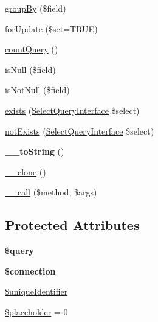 \begin{DoxyCompactItemize}
\item 
\hyperlink{classSelectQueryExtender_aa51fb0b6bc8b2484b52328f1109d1a48}{groupBy} (\$field)
\item 
\hyperlink{classSelectQueryExtender_a90e930c3ee67a055b81f7f31b18ba84e}{forUpdate} (\$set=TRUE)
\item 
\hyperlink{classSelectQueryExtender_a4c222f9407cc787f41b49be4b8ee26a5}{countQuery} ()
\item 
\hyperlink{classSelectQueryExtender_ad30e0f469cabfcc18f148468cc507cd8}{isNull} (\$field)
\item 
\hyperlink{classSelectQueryExtender_a24432e3ab40f7c1ce1404d6773e539f4}{isNotNull} (\$field)
\item 
\hyperlink{classSelectQueryExtender_aa250c6c085e53ac64607649f75b5f468}{exists} (\hyperlink{interfaceSelectQueryInterface}{SelectQueryInterface} \$select)
\item 
\hyperlink{classSelectQueryExtender_a0cd2b1d2e813fc6b8280221f6ca40777}{notExists} (\hyperlink{interfaceSelectQueryInterface}{SelectQueryInterface} \$select)
\item 
\hypertarget{classSelectQueryExtender_a0043e08d63d174a25378966bcc0d9282}{
{\bfseries \_\-\_\-toString} ()}
\label{classSelectQueryExtender_a0043e08d63d174a25378966bcc0d9282}

\item 
\hyperlink{classSelectQueryExtender_a3d9ade6266951fdc8e5757c8e61b352c}{\_\-\_\-clone} ()
\item 
\hyperlink{classSelectQueryExtender_a8cbcdc84cab9b35505c10b51d13efa89}{\_\-\_\-call} (\$method, \$args)
\end{DoxyCompactItemize}
\subsection*{Protected Attributes}
\begin{DoxyCompactItemize}
\item 
\hypertarget{classSelectQueryExtender_a1fc09fee1a46d42b556c2b9811b3f000}{
{\bfseries \$query}}
\label{classSelectQueryExtender_a1fc09fee1a46d42b556c2b9811b3f000}

\item 
\hypertarget{classSelectQueryExtender_ac2f144db843865830840e87ba7fea271}{
{\bfseries \$connection}}
\label{classSelectQueryExtender_ac2f144db843865830840e87ba7fea271}

\item 
\hyperlink{classSelectQueryExtender_a3be2ced1063e8a4f60e85700755fb5b5}{\$uniqueIdentifier}
\item 
\hyperlink{classSelectQueryExtender_af063c51deb020592cb27a2412649afbe}{\$placeholder} = 0
\end{DoxyCompactItemize}


